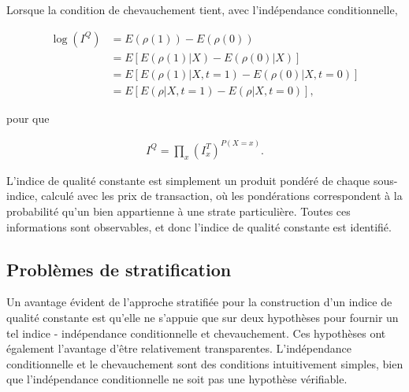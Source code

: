 \documentclass[]{article}
\begin{document}
Lorsque la condition de chevauchement tient, avec l'indépendance conditionnelle,

\begin{align*}
\log (I^{Q}) &= E(\rho(1)) - E(\rho(0)) \\
&= E[E(\rho(1) | X) - E(\rho(0) | X)] \\
&= E[E(\rho(1) | X, t = 1) - E(\rho(0) | X, t = 0)] \\
&= E[E(\rho | X, t = 1) - E(\rho | X, t = 0)],
\end{align*}

pour que

\begin{align*}
I^{Q} = \prod_{x} (I^{T}_{x})^{P(X = x)}.
\end{align*}

L'indice de qualité constante est simplement un produit pondéré de chaque sous-indice, calculé avec les prix de transaction, où les pondérations correspondent à la probabilité qu'un bien appartienne à une strate particulière. Toutes ces informations sont observables, et donc l'indice de qualité constante est identifié.

\hypertarget{probluxe8mes-de-stratification}{%
\subsection{Problèmes de stratification}\label{probluxe8mes-de-stratification}}

Un avantage évident de l'approche stratifiée pour la construction d'un indice de qualité constante est qu'elle ne s'appuie que sur deux hypothèses pour fournir un tel indice - indépendance conditionnelle et chevauchement. Ces hypothèses ont également l'avantage d'être relativement transparentes. L'indépendance conditionnelle et le chevauchement sont des conditions intuitivement simples, bien que l'indépendance conditionnelle ne soit pas une hypothèse vérifiable.
\end{document}
